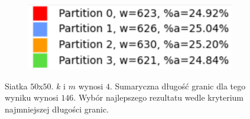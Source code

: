 \begin{figure}[h]
\begin{subfigure}{.33\textwidth}
    \caption[short]{}
\end{subfigure}
\begin{subfigure}{.33\textwidth}
    \centering
    \includegraphics[width=0.9\linewidth]{images/results/m/1/results}
    \caption[short]{}
\end{subfigure}
\caption{Siatka $50$x$50$. $k$ i $m$ wynosi $4$.
Sumaryczna długość granic dla tego wyniku wynosi $146$.
Wybór najlepszego rezultatu wedle kryterium najmniejszej długości granic.}
\label{result:m:1}
\end{figure}
